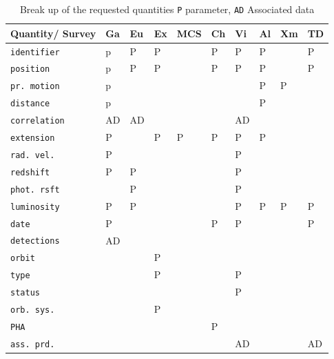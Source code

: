 \documentclass[11pt,a4paper]{ivoa}
\begin{document}
\begin{table}[ht!]
     \tiny
     \begin{tabular}{|p{2.4cm}|p{0.4cm}|p{0.4cm}|p{0.4cm}|p{0.6cm}|p{0.4cm}|p{0.4cm}|p{0.4cm}|p{0.4cm}|p{0.4cm}|}
       \hline Quantity/ Survey &  Ga &  Eu &  Ex &  MCS  &  Ch&  Vi &  Al &  Xm&  TD \\
       \hline  \texttt{identifier}      &  p & P  &P& &P&P &P&  & P \\
       \hline  \texttt{position}      &  p & P  &P& &P&P &P&  & P \\
       \hline  \texttt{pr. motion}   & p &   &   &    &  &   &P&P&    \\
       \hline  \texttt{distance}     & p &   &   &    &  &   &P&  &    \\
       \hline  \texttt{correlation}   & AD &AD&   &    &  &AD &   &  &    \\
       \hline  \texttt{extension}     &P&   &P&P &P&P& P&  &    \\
       \hline  \texttt{rad. vel.}       &  P &   &   &    &  &P&   &  &    \\
       \hline  \texttt{redshift}        &  P &P&   &    &  &P&   &  &    \\
       \hline  \texttt{phot. rsft}      &   &P&   &    &  &P&   &  &    \\
       \hline  \texttt{luminosity}    & P&P&   &    &  &P&P&P&P\\
       \hline  \texttt{date}             & P  &   &   &    & P&P&   &  &P\\
       \hline  \texttt{detections}    &  AD &   &   &    &  &   &   &  &    \\
       \hline  \texttt{orbit}             &   &   &P& &  &   &   &  &    \\
       \hline  \texttt{type}             &   &   & P& &  &P&   &  &    \\
       \hline  \texttt{status}          &   &   &   &    &  &P&   &  &    \\
       \hline  \texttt{orb. sys.}      &   &   &  P &    &  &   &   &  &    \\
       \hline  \texttt{PHA}            &   &   &   &    &P&   &   &  &    \\
       \hline  \texttt{ass. prd.}     &   &   &   &    &  &AD&   &  &AD \\
       \hline
     \end{tabular}
     \caption{ Break up of the requested quantities \texttt{P} parameter, \texttt{AD} Associated data}
     \label{tab:q_breakup}
 \end{table}
\end{document}
